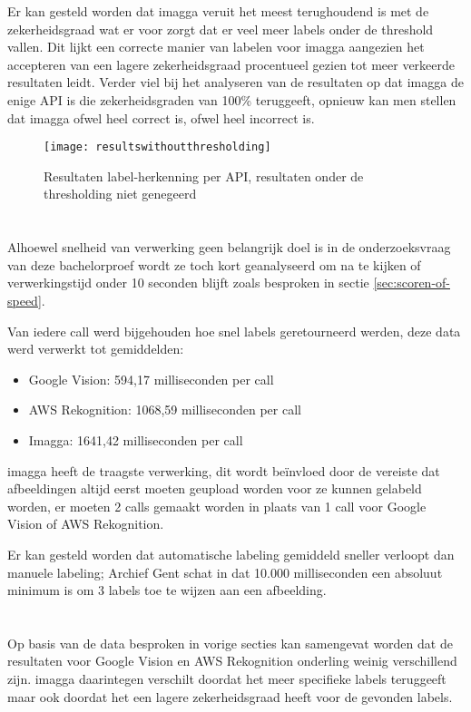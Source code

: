 Er kan gesteld worden dat imagga veruit het meest terughoudend is met de zekerheidsgraad wat er voor zorgt dat er veel meer labels onder de threshold vallen. Dit lijkt een correcte manier van labelen voor imagga aangezien het accepteren van een lagere zekerheidsgraad procentueel gezien tot meer verkeerde resultaten leidt. Verder viel bij het analyseren van de resultaten op dat imagga de enige API is die zekerheidsgraden van 100\% teruggeeft, opnieuw kan men stellen dat imagga ofwel heel correct is, ofwel heel incorrect is.

\begin{figure}
    \centering    
    \texttt{[image: resultswithoutthresholding]}
    \caption{Resultaten label-herkenning per API, resultaten onder de thresholding niet genegeerd}
    \label{fig:resultswithoutthresholding}
\end{figure}

\section{}
\label{sec:snelheid-per-api}
Alhoewel snelheid van verwerking geen belangrijk doel is in de onderzoeksvraag van deze bachelorproef wordt ze toch kort geanalyseerd om na te kijken of verwerkingstijd onder 10 seconden blijft zoals besproken in sectie \ref{sec:scoren-of-speed}.

Van iedere call werd bijgehouden hoe snel labels geretourneerd werden, deze data werd verwerkt tot gemiddelden:
\begin{itemize}
    \item Google Vision: 594,17 milliseconden per call
    \item AWS Rekognition: 1068,59 milliseconden per call
    \item Imagga: 1641,42 milliseconden per call
\end{itemize}

imagga heeft de traagste verwerking, dit wordt beïnvloed door de vereiste  dat afbeeldingen altijd eerst moeten geupload worden voor ze kunnen gelabeld worden, er moeten 2 calls gemaakt worden in plaats van 1 call voor Google Vision of AWS Rekognition.

Er kan gesteld worden dat automatische labeling gemiddeld sneller verloopt dan manuele labeling; Archief Gent schat in dat 10.000 milliseconden een absoluut minimum is om 3 labels toe te wijzen aan een afbeelding.

\section{}
\label{sec:besluit}
Op basis van de data besproken in vorige secties kan samengevat worden dat de resultaten voor Google Vision en AWS Rekognition onderling weinig verschillend zijn. imagga daarintegen verschilt doordat het meer specifieke labels teruggeeft maar ook doordat het een lagere zekerheidsgraad heeft voor de gevonden labels.

